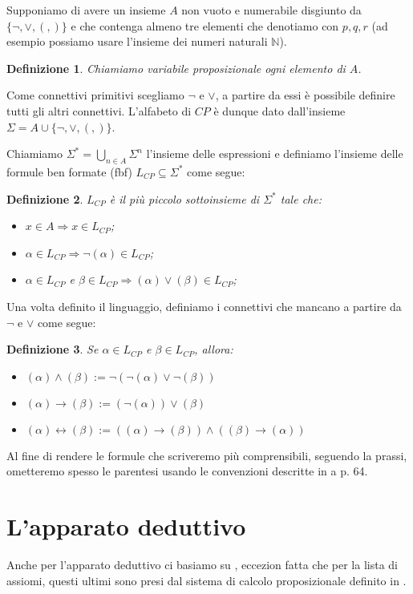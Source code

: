 \documentclass[a4paper, titlepage, 12pt]{report}
\newtheorem{definition}{Definizione}[chapter]
\begin{document}
Supponiamo di avere un insieme $A$ non vuoto e numerabile disgiunto da $\{\neg, \lor, (, )\}$
e che contenga almeno tre elementi che denotiamo con $p, q, r$
(ad esempio possiamo usare l'insieme dei numeri naturali $\mathbb{N}$).

\begin{definition}
Chiamiamo variabile proposizionale ogni elemento di $A$.
\end{definition}

Come connettivi primitivi scegliamo $\neg$ e $\lor$, a partire da essi è possibile definire tutti gli altri connettivi.
L'alfabeto di $CP$ è dunque dato dall'insieme $\Sigma = A \cup \{\neg, \lor, (, )\}$.

Chiamiamo $\Sigma^{*} = \bigcup_{n \in A} \Sigma^n$ l'insieme delle espressioni
e definiamo l'insieme delle formule ben formate (fbf) $L_{CP} \subseteq \Sigma^{*}$ come segue:
\begin{definition}
$L_{CP}$ è il più piccolo sottoinsieme di $\Sigma^{*}$ tale che:
\begin{itemize}
\item $x \in A \Rightarrow x \in L_{CP}$;
\item $\alpha \in L_{CP} \Rightarrow \neg (\alpha) \in L_{CP}$;
\item $\alpha \in L_{CP}$ e $\beta \in L_{CP} \Rightarrow (\alpha) \lor (\beta) \in L_{CP}$;
\end{itemize}
\end{definition}

Una volta definito il linguaggio, definiamo i connettivi che mancano a partire da $\neg$ e $\lor$
come segue:
\begin{definition}
Se $\alpha \in L_{CP}$ e $\beta \in L_{CP}$, allora:
\begin{itemize}
\item $(\alpha) \land (\beta) := \neg(\neg(\alpha) \lor \neg(\beta))$
\item $(\alpha) \rightarrow (\beta) := (\neg(\alpha)) \lor (\beta)$
\item $(\alpha) \leftrightarrow (\beta) := ((\alpha) \rightarrow (\beta)) \land ((\beta) \rightarrow (\alpha))$
\end{itemize}
\end{definition}

Al fine di rendere le formule che scriveremo più comprensibili, seguendo la prassi,
ometteremo spesso le parentesi usando le convenzioni descritte in \cite{Tortora} a p. 64.

\section{L'apparato deduttivo}
Anche per l'apparato deduttivo ci basiamo su \cite{IntroModale}, eccezion fatta che
per la lista di assiomi,
questi ultimi sono presi dal sistema di calcolo proposizionale definito in \cite{Kleene}.
\end{document}
